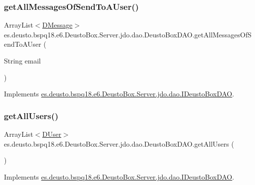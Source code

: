 \subsubsection{\texorpdfstring{get\+All\+Messages\+Of\+Send\+To\+A\+User()}{getAllMessagesOfSendToAUser()}}
{\footnotesize\ttfamily Array\+List$<$\mbox{\hyperlink{classes_1_1deusto_1_1bspq18_1_1e6_1_1_deusto_box_1_1_server_1_1jdo_1_1data_1_1_d_message}{D\+Message}}$>$ es.\+deusto.\+bspq18.\+e6.\+Deusto\+Box.\+Server.\+jdo.\+dao.\+Deusto\+Box\+D\+A\+O.\+get\+All\+Messages\+Of\+Send\+To\+A\+User (\begin{DoxyParamCaption}\item[{String}]{email }\end{DoxyParamCaption})}



Implements \mbox{\hyperlink{interfacees_1_1deusto_1_1bspq18_1_1e6_1_1_deusto_box_1_1_server_1_1jdo_1_1dao_1_1_i_deusto_box_d_a_o_a094a7ffc9b83044c593b5f2c3d5e3068}{es.\+deusto.\+bspq18.\+e6.\+Deusto\+Box.\+Server.\+jdo.\+dao.\+I\+Deusto\+Box\+D\+AO}}.

\mbox{\label{classes_1_1deusto_1_1bspq18_1_1e6_1_1_deusto_box_1_1_server_1_1jdo_1_1dao_1_1_deusto_box_d_a_o_af6a98ee487f66dcbc56663226d7ce425}} 
\subsubsection{\texorpdfstring{get\+All\+Users()}{getAllUsers()}}
{\footnotesize\ttfamily Array\+List$<$\mbox{\hyperlink{classes_1_1deusto_1_1bspq18_1_1e6_1_1_deusto_box_1_1_server_1_1jdo_1_1data_1_1_d_user}{D\+User}}$>$ es.\+deusto.\+bspq18.\+e6.\+Deusto\+Box.\+Server.\+jdo.\+dao.\+Deusto\+Box\+D\+A\+O.\+get\+All\+Users (\begin{DoxyParamCaption}{ }\end{DoxyParamCaption})}



Implements \mbox{\hyperlink{interfacees_1_1deusto_1_1bspq18_1_1e6_1_1_deusto_box_1_1_server_1_1jdo_1_1dao_1_1_i_deusto_box_d_a_o_ae04e180df7666d21b8c09129c2f5e757}{es.\+deusto.\+bspq18.\+e6.\+Deusto\+Box.\+Server.\+jdo.\+dao.\+I\+Deusto\+Box\+D\+AO}}.

